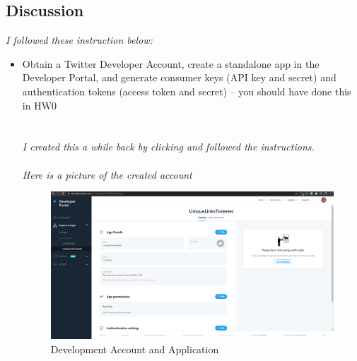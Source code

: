 \documentclass[12pt]{article}
\begin{document}
\subsection*{Discussion}

\emph{I followed these instruction below:}

\begin{itemize}
    \item Obtain a Twitter Developer Account, create a standalone app in the Developer Portal, and generate consumer keys (API key and secret) and authentication tokens (access token and secret) -- you should have done this in HW0
    \emph{\\ \\ \color{blue}{Answer:}}
    \emph{\\   I created this a while back by clicking  \href{https://developer.twitter.com/en/apply-for-access}{\color{red}{Apply for Access}} and followed the instructions. \\ \\ Here is a picture of the created account}
    \begin{figure}[H]
        \centering
        \includegraphics[trim=0 10 0 80, clip, width=\textwidth] {twiiterAccountPNG.PNG}
        \caption{Development Account and Application}
        \label{fig:Dev Account}
    \end{figure}
        

\end{itemize}
\end{document}
